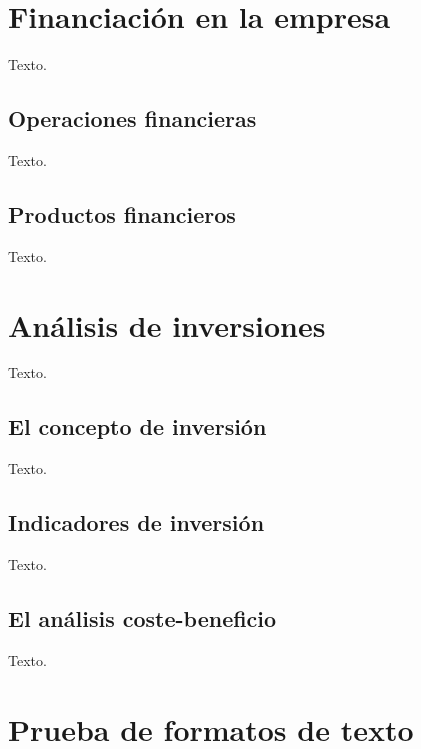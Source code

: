 \documentclass[
]{krantz}
\begin{document}
\hypertarget{financiaciuxf3n-en-la-empresa}{%
\chapter{Financiación en la empresa}\label{financiaciuxf3n-en-la-empresa}}

Texto.

\hypertarget{operaciones-financieras}{%
\section{Operaciones financieras}\label{operaciones-financieras}}

Texto.

\hypertarget{productos-financieros}{%
\section{Productos financieros}\label{productos-financieros}}

Texto.

\hypertarget{anuxe1lisis-de-inversiones}{%
\chapter{Análisis de inversiones}\label{anuxe1lisis-de-inversiones}}

Texto.

\hypertarget{el-concepto-de-inversiuxf3n}{%
\section{El concepto de inversión}\label{el-concepto-de-inversiuxf3n}}

Texto.

\hypertarget{indicadores-de-inversiuxf3n}{%
\section{Indicadores de inversión}\label{indicadores-de-inversiuxf3n}}

Texto.

\hypertarget{el-anuxe1lisis-coste-beneficio}{%
\section{El análisis coste-beneficio}\label{el-anuxe1lisis-coste-beneficio}}

Texto.

\hypertarget{prueba-de-formatos-de-texto}{%
\chapter{Prueba de formatos de texto}\label{prueba-de-formatos-de-texto}}
\end{document}
